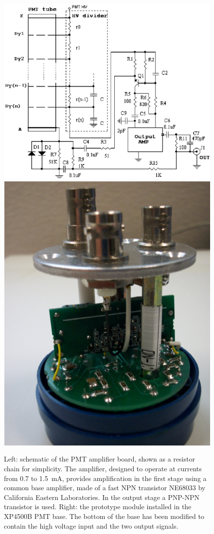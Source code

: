 \begin{figure}
	\centering
	\includegraphics[width=1.25\columnwidth, keepaspectratio]{img/dividerSchematic.png}
	\includegraphics[width=0.75\columnwidth, height=0.95\columnwidth]{img/pmtWithDivider.png}
	\caption{Left: schematic of the PMT amplifier board, shown as a resistor chain for simplicity. The amplifier,
          designed to operate at currents from 0.7 to 1.5~mA, provides amplification in the first stage using a common
          base amplifier, made of a fast NPN transistor NE68033 by California Eastern Laboratories. In the output
          stage a PNP-NPN transistor is used. Right: the prototype module installed in the XP4500B PMT base. The
          bottom of the base has been modified to contain the high voltage input and the two output signals.}
	\label{fig:pmtWithDivider}
\end{figure}

